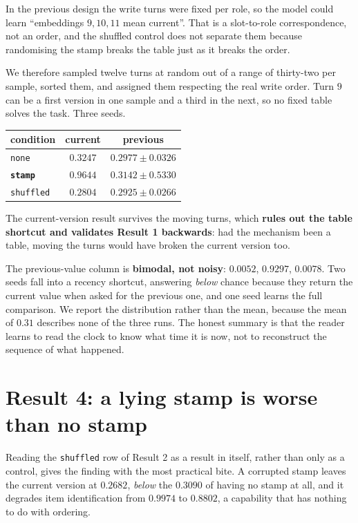 \documentclass[11pt,a4paper]{article}
\begin{document}
In the previous design the write turns were fixed per role, so the model could learn ``embeddings
$9,10,11$ mean current''. That is a slot-to-role correspondence, not an order, and the shuffled control
does not separate them because randomising the stamp breaks the table just as it breaks the order.

We therefore sampled twelve turns at random out of a range of thirty-two per sample, sorted them, and
assigned them respecting the real write order. Turn $9$ can be a first version in one sample and a
third in the next, so no fixed table solves the task. Three seeds.

\begin{center}
\begin{tabular}{lcc}
\toprule
condition & \textbf{current} & previous \\
\midrule
\texttt{none} & $0.3247$ & $0.2977 \pm 0.0326$ \\
\textbf{\texttt{stamp}} & $\mathbf{0.9644}$ & $0.3142 \pm 0.5330$ \\
\texttt{shuffled} & $0.2804$ & $0.2925 \pm 0.0266$ \\
\bottomrule
\end{tabular}
\end{center}

The current-version result survives the moving turns, which \textbf{rules out the table shortcut and
validates Result 1 backwards}: had the mechanism been a table, moving the turns would have broken the
current version too.

The previous-value column is \textbf{bimodal, not noisy}: $0.0052$, $0.9297$, $0.0078$. Two seeds fall
into a recency shortcut, answering \emph{below} chance because they return the current value when asked
for the previous one, and one seed learns the full comparison. We report the distribution rather than
the mean, because the mean of $0.31$ describes none of the three runs. The honest summary is that the
reader learns to read the clock to know what time it is now, not to reconstruct the sequence of what
happened.

\section{Result 4: a lying stamp is worse than no stamp}

Reading the \texttt{shuffled} row of Result 2 as a result in itself, rather than only as a control,
gives the finding with the most practical bite. A corrupted stamp leaves the current version at
$0.2682$, \emph{below} the $0.3090$ of having no stamp at all, and it degrades item identification from
$0.9974$ to $0.8802$, a capability that has nothing to do with ordering.
\end{document}

